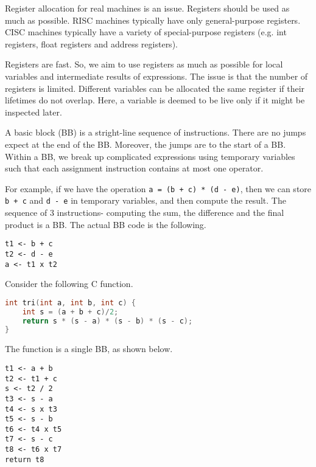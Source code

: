 \documentclass[a4paper, openany]{memoir}
\begin{document}
Register allocation for real machines is an issue. Registers should be used as much as possible. RISC machines typically have only general-purpose registers. CISC machines typically have a variety of special-purpose registers (e.g. int registers, float registers and address registers).

Registers are fast. So, we aim to use registers as much as possible for local variables and intermediate results of expressions. The issue is that the number of registers is limited. Different variables can be allocated the same register if their lifetimes do not overlap. Here, a variable is deemed to be live only if it might be inspected later.

A basic block (BB) is a stright-line sequence of instructions. There are no jumps expect at the end of the BB. Moreover, the jumps are to the start of a BB. Within a BB, we break up complicated expressions using temporary variables such that each assignment instruction contains at most one operator. 

For example, if we have the operation \texttt{a = (b + c) * (d - e)}, then we can store \texttt{b + c} and \texttt{d - e} in temporary variables, and then compute the result. The sequence of 3 instructions- computing the sum, the difference and the final product is a BB.
The actual BB code is the following.
\begin{lstlisting}
t1 <- b + c
t2 <- d - e
a <- t1 x t2
\end{lstlisting}

Consider the following C function.
\begin{lstlisting}[language=C]
int tri(int a, int b, int c) {
    int s = (a + b + c)/2;
    return s * (s - a) * (s - b) * (s - c);
}
\end{lstlisting}
The function is a single BB, as shown below.
\begin{lstlisting}
t1 <- a + b
t2 <- t1 + c
s <- t2 / 2
t3 <- s - a
t4 <- s x t3
t5 <- s - b
t6 <- t4 x t5
t7 <- s - c
t8 <- t6 x t7
return t8
\end{lstlisting}
\end{document}

